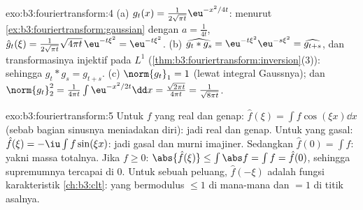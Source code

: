 \begin{solution}{exo:b3:fouriertransform:4}
(a) $g_t(x) = \frac1{2\sqrt{\pi t}}\eu^{-x^2/4t}$: menurut
\cref{ex:b3:fouriertransform:gaussian} dengan $a = \frac1{4t}$,
$\hat g_t(\xi) = \frac1{2\sqrt{\pi t}}\sqrt{4\pi
t}\,\eu^{-t\xi^2} = \eu^{-t\xi^2}$.
(b) $\widehat{g_t * g_s} = \eu^{-t\xi^2}\eu^{-s\xi^2} =
\widehat{g_{t+s}}$, dan transformasinya injektif pada $L^1$
(\cref{thm:b3:fouriertransform:inversion}(3)): sehingga $g_t * g_s =
g_{t+s}$.
(c) $\norm{g_t}_1 = 1$ (lewat integral Gaussnya); dan
$\norm{g_t}_2^2 = \frac1{4\pi t}\int\eu^{-x^2/2t}\dd x =
\frac{\sqrt{2\pi t}}{4\pi t} = \frac1{\sqrt{8\pi t}}$.
\end{solution}

\begin{solution}{exo:b3:fouriertransform:5}
Untuk $f$ yang real dan genap: $\hat f(\xi) = \int f\cos(\xi x)\dd x$ (sebab
bagian sinusnya meniadakan diri): jadi real dan genap. Untuk yang gasal: $\hat f(\xi) =
-\iu\int f\sin(\xi x)$: jadi gasal dan murni imajiner. Sedangkan $\hat f(0) =
\int f$: yakni massa totalnya. Jika $f \geq 0$: $\abs{\hat f(\xi)}
\leq \int\abs f = \int f = \hat f(0)$, sehingga supremumnya tercapai
di $0$. Untuk sebuah  peluang, $\hat f(-\xi)$ adalah
fungsi karakteristik \cref{ch:b3:clt}: yang bermodulus $\leq 1$
di mana-mana dan $= 1$ di titik asalnya.
\end{solution}

